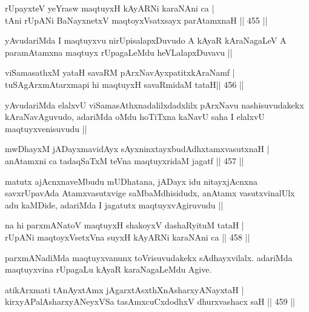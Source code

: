 
\begin{shl}
rUpayxteV yeYrasw maqtuyxH kAyARNi karaNAni ca | \\
tAni rUpANi BaNayxnetxV maqtoyxVsatxsayx parAtamxnaH \hfill||  455 || 
\end{shl}

\begin{artha}
yAvudariMda I maqtuyxvu nirUpisalapxDuvudo A kAyaR kAraNagaLeV A paramAtamxna maqtuyx rUpagaLeMdu heVLalapxDuvavu ||
\end{artha}

\begin{shl}
viSamasathxM yataH savaRM pArxNavAyxpatitxkAraNamf | \\
tuSAgArxmAtarxmapi hi maqtuyxH savaRmidaM tataH\hfill ||  456 ||  
\end{shl}

\begin{artha}
yAvudariMda elalxvU viSamasAthxnadalilxdadxlilx pArxNavu nashisuvudakekx kAraNavAguvudo, adariMda oMdu hoTiTxna kaNavU saha I elalxvU maqtuyxvenisuvudu ||
\end{artha}

\begin{shl}
mwDhayxM jADayxmavidAyx sAyxninxtayxbudAdhxtamxvasutxnaH | \\
anAtamxni ca tadaqSaTxM teVna maqtuyxridaM jagatf \hfill||  457 || 
\end{shl}

\begin{artha}
matutx ajAcnxnaveMbudu mUDhatana, jADayx idu nitayxjAcnxna savxrUpavAda Atamxvasutxvige saMbaMdhisidudx, anAtamx vasutxvinalUlx adu kaMDide, adariMda I jagatutx maqtuyxvAgiruvudu ||
\end{artha}

\begin{shl}
na hi parxmANatoV maqtuyxH shakoyxV dashaRyituM tataH | \\
rUpANi maqtoyxVsetxVna suyxH kAyARNi karaNAni ca \hfill||  458 ||  
\end{shl}

\begin{artha}
parxmANadiMda maqtuyxvanunx toVrisuvudakekx sAdhayxvilalx. adariMda maqtuyxvina rUpagaLu kAyaR karaNagaLeMdu Agive.
\end{artha}

\begin{shl}
atikArxmati tAnAyxtAmx jAgarxtAsxthXnAsharxyANayxtaH | \\
kirxyAPalAsharxyANeyxVSa tasAmxcuCxdodhxV dhurxvashacx saH \hfill||  459 ||  
\end{shl}


